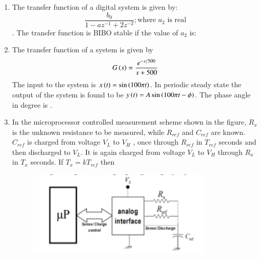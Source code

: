 \documentclass[journal,12pt,onecolumn]{IEEEtran}
\theoremstyle{remark}
\begin{document}
\begin{enumerate}
    \item The transfer function of a digital system is given by: $$\frac{b_0}{1 - az^{-1} + 2z^{-2}}; \text{where $a_2$ is real}$$. The transfer function is BIBO stable if the value of $a_2$ is:

    \hfill{}
        \begin{enumerate}
        \end{enumerate}

    \item The transfer function of a system is given by $$G\left(s\right) = \frac{e^{-s/500}}{s+500}$$ The input to the system is $x\left(t\right) = \sin\left(100\pi t\right)$. In periodic steady state the output of the system is found to be $y\left(t\right) = A\sin\left(100\pi t - \phi\right)$. The phase angle \brak{\phi} in degree is \underline{\hspace{2cm}}.

    \hfill{}

    
    
    \item In the microprocessor controlled measurement scheme shown in the figure, $R_x$ is the unknown resistance to be measured, while $R_{ref}$ and $C_{ref}$ are known. $C_{ref}$ is charged from voltage $V_L$ to $V_H$ , once through $R_{ref}$ in $T_{ref}$ seconds and then discharged to $V_L$. It is again charged from voltage $V_L$ to $V_H$ through $R_x$ in $T_x$ seconds. If $T_x = k T_{ref}$ then
    \begin{figure}[H]
        \centering
        \includegraphics[width=0.6\columnwidth]{q47}
        \caption*{}
        \label{Q47}
    \end{figure}


\end{enumerate}
\end{document}
